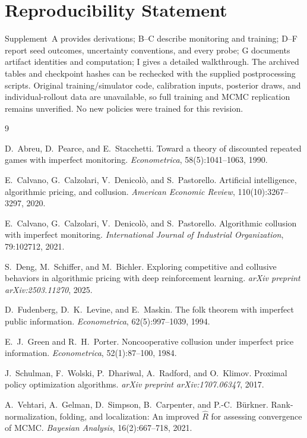 \documentclass{article}
\begin{document}
\section*{Reproducibility Statement}
Supplement~A provides derivations; B--C describe monitoring and training; D--F report seed outcomes, uncertainty conventions, and every probe; G documents artifact identities and computation; I gives a detailed walkthrough. The archived tables and checkpoint hashes can be rechecked with the supplied postprocessing scripts. Original training/simulator code, calibration inputs, posterior draws, and individual-rollout data are unavailable, so full training and MCMC replication remains unverified. No new policies were trained for this revision.

\clearpage

\begin{thebibliography}{9}

D.~Abreu, D.~Pearce, and E.~Stacchetti.
\newblock Toward a theory of discounted repeated games with imperfect
  monitoring.
\newblock \emph{Econometrica}, 58(5):1041--1063, 1990.

E.~Calvano, G.~Calzolari, V.~Denicol\`o, and S.~Pastorello.
\newblock Artificial intelligence, algorithmic pricing, and collusion.
\newblock \emph{American Economic Review}, 110(10):3267--3297, 2020.

E.~Calvano, G.~Calzolari, V.~Denicol\`o, and S.~Pastorello.
\newblock Algorithmic collusion with imperfect monitoring.
\newblock \emph{International Journal of Industrial Organization}, 79:102712,
  2021.

S.~Deng, M.~Schiffer, and M.~Bichler.
\newblock Exploring competitive and collusive behaviors in algorithmic
  pricing with deep reinforcement learning.
\newblock \emph{arXiv preprint arXiv:2503.11270}, 2025.

D.~Fudenberg, D.~K.~Levine, and E.~Maskin.
\newblock The folk theorem with imperfect public information.
\newblock \emph{Econometrica}, 62(5):997--1039, 1994.

E.~J.~Green and R.~H.~Porter.
\newblock Noncooperative collusion under imperfect price information.
\newblock \emph{Econometrica}, 52(1):87--100, 1984.

J.~Schulman, F.~Wolski, P.~Dhariwal, A.~Radford, and O.~Klimov.
\newblock Proximal policy optimization algorithms.
\newblock \emph{arXiv preprint arXiv:1707.06347}, 2017.

A.~Vehtari, A.~Gelman, D.~Simpson, B.~Carpenter, and P.-C.~B\"urkner.
\newblock Rank-normalization, folding, and localization: An improved
  $\hat{R}$ for assessing convergence of {MCMC}.
\newblock \emph{Bayesian Analysis}, 16(2):667--718, 2021.

\end{thebibliography}
\end{document}
